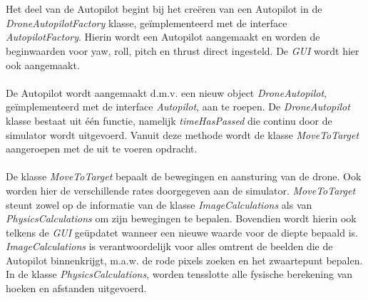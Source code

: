 \\
\\
Het deel van de Autopilot begint bij het cre\"eren van een Autopilot in de \textit{DroneAutopilotFactory} klasse, ge\"implementeerd met de interface \textit{AutopilotFactory}. Hierin wordt een Autopilot aangemaakt en worden de beginwaarden voor yaw, roll, pitch en thrust direct ingesteld. De \textit{GUI} wordt hier ook aangemaakt.
\\
\\
De Autopilot wordt aangemaakt d.m.v. een nieuw object \textit{DroneAutopilot}, ge\"implementeerd met de interface \textit{Autopilot}, aan te roepen. De \textit{DroneAutopilot} klasse bestaat uit één functie, namelijk \textit{timeHasPassed} die continu door de simulator wordt uitgevoerd. Vanuit deze methode wordt de klasse \textit{MoveToTarget} aangeroepen met de uit te voeren opdracht.
\\
\\
De klasse \textit{MoveToTarget} bepaalt de bewegingen en aansturing van de drone. Ook worden hier de verschillende rates doorgegeven aan de simulator. \textit{MoveToTarget} steunt zowel op de informatie van de klasse \textit{ImageCalculations} als van \textit{PhysicsCalculations} om zijn bewegingen te bepalen. Bovendien wordt hierin ook telkens de \textit{GUI} ge\"updatet wanneer een nieuwe waarde voor de diepte bepaald is.
\\
\textit{ImageCalculations} is verantwoordelijk voor alles omtrent de beelden die de Autopilot binnenkrijgt, m.a.w. de rode pixels zoeken en het zwaartepunt bepalen.
In de klasse \textit{PhysicsCalculations}, worden tensslotte alle fysische berekening van hoeken en afstanden uitgevoerd.
